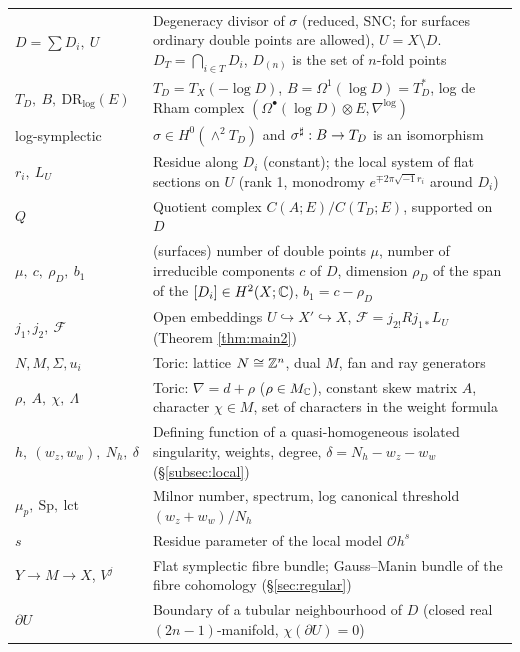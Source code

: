 \begin{longtable}{>{\raggedright\arraybackslash}p{3.5cm}>{\raggedright\arraybackslash}p{11.3cm}}
\footnotesize $D=\sum D_i,\ U$ & Degeneracy divisor of $\sigma$ (reduced, SNC; for surfaces ordinary double points are allowed), $U=X\setminus D$. $D_T=\bigcap_{i\in T}D_i$, $D_{(n)}$ is the set of $n$-fold points\\
\footnotesize $T_D,\ B,\ \mathrm{DR}_{\log}(E)$ & $T_D=T_X(-\log D)$, $B=\Omega^1(\log D)=T_D^*$, log de Rham complex $(\Omega^\bullet(\log D)\otimes E,\nabla^{\log})$\\
\footnotesize log-symplectic & $\sigma\in H^0(\wedge^2T_D)$ and $\sigma^\sharp:B\to T_D$ is an isomorphism\\
\footnotesize $r_i,\ L_U$ & Residue along $D_i$ (constant); the local system of flat sections on $U$ (rank 1, monodromy $e^{\mp2\pi\sqrt{-1}r_i}$ around $D_i$)\\
\footnotesize $Q$ & Quotient complex $C(A;E)/C(T_D;E)$, supported on $D$\\
\footnotesize $\mu,\ c,\ \rho_D,\ b_1$ & (surfaces) number of double points $\mu$, number of irreducible components $c$ of $D$, dimension $\rho_D$ of the span of the $[D_i]\in H^2(X;\mathbb C)$, $b_1=c-\rho_D$\\
\footnotesize $j_1,j_2,\ \mathcal F$ & Open embeddings $U\hookrightarrow X'\hookrightarrow X$, $\mathcal F=j_{2!}Rj_{1*}L_U$ (Theorem \ref{thm:main2})\\
\footnotesize $N,M,\Sigma,u_i$ & Toric: lattice $N\cong\mathbb Z^n$, dual $M$, fan and ray generators\\
\footnotesize $\rho,\ A,\ \chi,\ \Lambda$ & Toric: $\nabla=d+\rho$ ($\rho\in M_\mathbb C$), constant skew matrix $A$, character $\chi\in M$, set of characters in the weight formula\\
\footnotesize $h,\ (w_z,w_w),\ N_h,\ \delta$ & Defining function of a quasi-homogeneous isolated singularity, weights, degree, $\delta=N_h-w_z-w_w$ (\S\ref{subsec:local})\\
\footnotesize $\mu_p,\ \mathrm{Sp},\ \mathrm{lct}$ & Milnor number, spectrum, log canonical threshold $(w_z+w_w)/N_h$\\
\footnotesize $s$ & Residue parameter of the local model $\mathcal O h^s$\\
\footnotesize $Y\to M\to X$, $V^j$ & Flat symplectic fibre bundle; Gauss--Manin bundle of the fibre cohomology (\S\ref{sec:regular})\\
\footnotesize $\partial U$ & Boundary of a tubular neighbourhood of $D$ (closed real $(2n-1)$-manifold, $\chi(\partial U)=0$)\\
\end{longtable}
